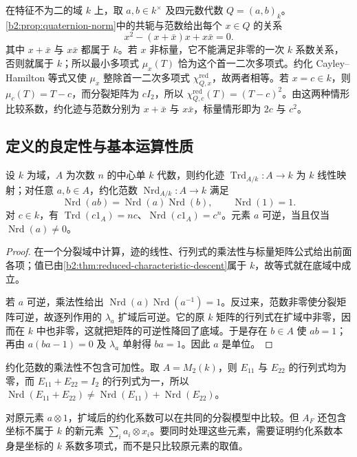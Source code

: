 \ProseParagraphBreak
在特征不为二的域 \(k\) 上，取 \(a,b\in k^\times\) 及四元数代数 \(Q=(a,b)_k\)。\cref{b2:prop:quaternion-norm}中的共轭与范数给出每个 \(x\in Q\) 的关系
\[
	x^2-(x+\bar x)x+x\bar x=0.
\]
其中 \(x+\bar x\) 与 \(x\bar x\) 都属于 \(k\)。若 \(x\) 非标量，它不能满足非零的一次 \(k\) 系数关系，否则就属于 \(k\)；所以最小多项式 \(\mu_x(T)\) 恰为这个首一二次多项式。约化 Cayley--Hamilton 等式又使 \(\mu_x\) 整除首一二次多项式 \(\chi^{\mathrm{red}}_{Q,x}\)，故两者相等。若 \(x=c\in k\)，则 \(\mu_c(T)=T-c\)，而分裂矩阵为 \(cI_2\)，所以 \(\chi^{\mathrm{red}}_{Q,c}(T)=(T-c)^2\)。由这两种情形比较系数，约化迹与范数分别为 \(x+\bar x\) 与 \(x\bar x\)，标量情形即为 \(2c\) 与 \(c^2\)。

\subsection{定义的良定性与基本运算性质}
\label{b2:subsec:1803:03}

\begin{proposition}\label{b2:prop:reduced-trace-norm-properties}
	设 \(k\) 为域，\(A\) 为次数 \(n\) 的中心单 \(k\) 代数，则约化迹 \(\operatorname{Trd}_{A/k}:A\rightarrow k\) 为 \(k\) 线性映射；对任意 \(a,b\in A\)，约化范数 \(\operatorname{Nrd}_{A/k}:A\rightarrow k\) 满足
	\[
		\operatorname{Nrd}(ab)=\operatorname{Nrd}(a)\operatorname{Nrd}(b),\qquad \operatorname{Nrd}(1)=1.
	\]
	对 \(c\in k\)，有 \(\operatorname{Trd}(c1_A)=nc\)、\(\operatorname{Nrd}(c1_A)=c^n\)。元素 \(a\) 可逆，当且仅当 \(\operatorname{Nrd}(a)\ne0\)。
\end{proposition}
\begin{proof}
	在一个分裂域中计算，迹的线性、行列式的乘法性与标量矩阵公式给出前面各项；值已由\cref{b2:thm:reduced-characteristic-descent}属于 \(k\)，故等式就在底域中成立。

	若 \(a\) 可逆，乘法性给出 \(\operatorname{Nrd}(a)\operatorname{Nrd}(a^{-1})=1\)。反过来，范数非零使分裂矩阵可逆，故逐列作用的 \(\lambda_a\) 扩域后可逆。它的原 \(k\) 矩阵的行列式在扩域中非零，因而在 \(k\) 中也非零，这就把矩阵的可逆性降回了底域。于是存在 \(b\in A\) 使 \(ab=1\)；再由 \(a(ba-1)=0\) 及 \(\lambda_a\) 单射得 \(ba=1\)。因此 \(a\) 是单位。
\end{proof}

约化范数的乘法性不包含可加性。取 \(A=M_2(k)\)，则 \(E_{11}\) 与 \(E_{22}\) 的行列式均为零，而 \(E_{11}+E_{22}=I_2\) 的行列式为一，所以 \(\operatorname{Nrd}(E_{11}+E_{22})\ne\operatorname{Nrd}(E_{11})+\operatorname{Nrd}(E_{22})\)。

\ProseParagraphBreak
对原元素 \(a\otimes1\)，扩域后的约化系数可以在共同的分裂模型中比较。但 \(A_F\) 还包含坐标不属于 \(k\) 的新元素 \(\sum_i a_i\otimes x_i\)。要同时处理这些元素，需要证明约化系数本身是坐标的 \(k\) 系数多项式，而不是只比较原元素的取值。

